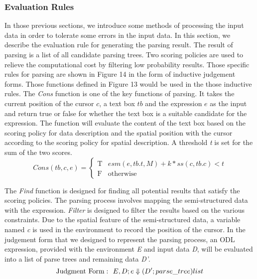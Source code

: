 {\subsubsection{Evaluation Rules}

In those previous sections, we introduce some methods of processing the input data in order to tolerate some errors in the input data. In this section, we describe the evaluation rule for generating the parsing result. 
The result of parsing is a list of all candidate parsing trees. Two scoring 
policies are used to relieve the computational cost by filtering low probability results. Those specific rules for parsing are shown in Figure 14 in the form of inductive judgement forms. Those functions defined in Figure 13 would be used in the those inductive rules.
The {\em Cons} function is one of the key functions of parsing. It takes 
the current position of the cursor $c$, a text box $tb$ and the expression $e$ as the input 
and return true or false for whether the text box is a suitable candidate for the 
expression. The function will evaluate the content of the text box based on 
the scoring policy for data description and the spatial position 
with the cursor according to the scoring policy for spatial description. 
A threshold {\em t} is set for the sum of the two scores.
\begin{equation}
Cons(tb, c, e) = 
\begin{cases}
\text{T}& \text{$esm(e, tb.t, M)+k*ss(c, tb.c) < t$}\\
\text{F}& \text{otherwise}
\end{cases}
\label{equ:constraint}
\end{equation}

The {\em Find} function is 
designed for finding all potential results that satisfy the scoring policies. 
The parsing process involves mapping the semi-structured data with the expression. 
{\em Filter} is designed to filter the results based on the various constraints. 
Due to 
the spatial feature of the semi-structured data, 
a variable named {\em c} is used 
in the environment to record the position of the cursor.
In the judgement form that we designed to represent the parsing process, an ODL 
expression, provided with the environment {\em E} and input data {\em D}, will be 
evaluated into a list of parse trees and remaining data {\em D'}.
\[
  {\rm Judgment~ Form:}~~ E,D;e \Downarrow (D';parse\_tree)list
  \label{semantics:judegement} 
\]

}
